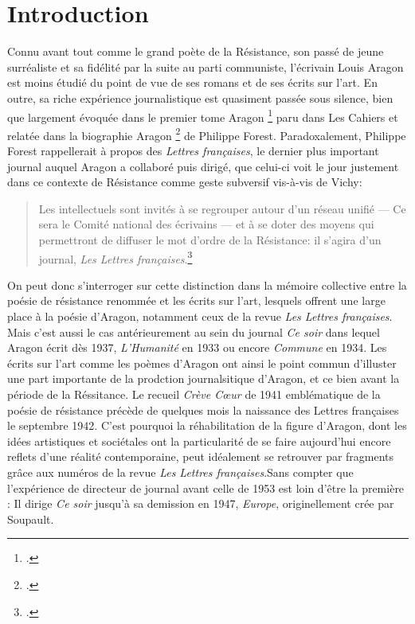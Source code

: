 \chapter*{Introduction} 

Connu avant tout comme le grand poète de la Résistance, son passé de jeune surréaliste et sa fidélité par la suite au parti communiste, l'écrivain Louis Aragon est moins étudié du point de vue de ses romans et de ses écrits sur l'art. En outre, sa riche expérience journalistique est quasiment passée sous silence, bien que largement évoquée dans le premier tome Aragon \footcite[]{cahiers} paru dans Les Cahiers et relatée dans la biographie Aragon \footcite[]{biographie}  de Philippe Forest. Paradoxalement, Philippe Forest rappellerait à propos des \emph{Lettres françaises}, le dernier plus important journal auquel Aragon a collaboré puis dirigé, que celui-ci voit le jour justement dans ce contexte de Résistance comme geste subversif vis-à-vis de Vichy:
\begin{quote} 
Les intellectuels sont invités à se regrouper autour d'un réseau unifié --- Ce sera le Comité national des écrivains --- et à se doter des moyens qui permettront de diffuser le mot d'ordre de la Résistance: il s'agira d'un journal, \emph{Les Lettres françaises}.\footcite[]{biographie}
\end{quote}
On peut donc s'interroger sur cette distinction dans la mémoire collective entre la poésie de résistance renommée et les écrits sur l'art, lesquels offrent une large place à la poésie d'Aragon, notamment ceux de la revue \emph{Les Lettres françaises}. Mais c'est aussi le cas antérieurement au sein du journal \emph{Ce soir} dans lequel Aragon écrit dès 1937, \emph{L'Humanité} en 1933 ou encore \emph{Commune} en 1934. Les écrits sur l'art comme les poèmes d'Aragon ont ainsi le point commun d'illuster une part importante de la prodction journalsitique d'Aragon, et ce bien avant la période de la Réssitance. Le recueil \emph{Crève C\oe{}ur }de 1941 emblématique de la poésie de résistance précède de quelques mois la naissance des Lettres françaises le septembre 1942. C'est pourquoi la réhabilitation de la figure d'Aragon, dont les idées artistiques et sociétales ont la particularité de se faire aujourd'hui encore reflets d'une réalité contemporaine, peut idéalement se retrouver par fragments grâce aux numéros de la revue \emph{Les Lettres françaises}.Sans compter que l'expérience de directeur de journal avant celle de 1953 est loin d'être la première : Il dirige \emph{Ce soir} jusqu'à sa demission en 1947, \emph{Europe}, originellement crée par Soupault. 


